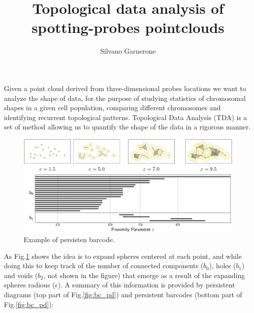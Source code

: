 \documentclass[12pt,a4paper]{article}
\author{Silvano Garnerone}
\title{Topological data analysis of spotting-probes pointclouds}
\begin{document}
    
\maketitle

Given a point cloud derived from three-dimensional probes locations we want to analyze the shape of data, for the purpose of studying statistics of chromosomal shapes in a given cell population, comparing different chromosomes and identifying recurrent topological patterns.
Topological Data Analysis (TDA) is a set of method allowing us to quantify the shape of the data in a rigorous manner. 
\begin{figure}[hbtp]
\centering
\includegraphics[scale=0.75]{PHbarcodeExample.png}
\caption{Example of persisten barcode.}
\label{fig:per_bc}
\end{figure}
As Fig.\ref{fig:per_bc} shows the idea is to expand spheres centered at each point, and while doing this to keep track of the number of connected components ($b_0$), holes ($b_1$) and voids ($b_2$, not shown in the figure) that emerge as a result of the expanding spheres radious ($\epsilon$). A summary of this information is provided by persistent diagrams (top part of Fig.\ref{fig:bc_pd}) and persistent barcodes (bottom part of Fig.\ref{fig:bc_pd}):
\end{document}
